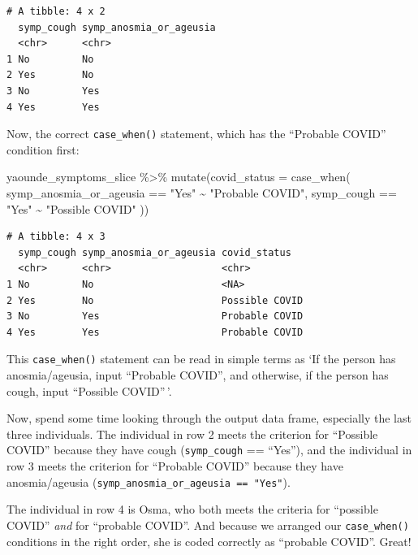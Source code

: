\documentclass[
  letterpaper,
  DIV=11,
  numbers=noendperiod]{scrreprt}
\newenvironment{Shaded}{\begin{snugshade}}{\end{snugshade}}
\newcommand{\AttributeTok}[1]{\textcolor[rgb]{0.40,0.45,0.13}{#1}}
\newcommand{\FunctionTok}[1]{\textcolor[rgb]{0.28,0.35,0.67}{#1}}
\newcommand{\NormalTok}[1]{\textcolor[rgb]{0.00,0.23,0.31}{#1}}
\newcommand{\SpecialCharTok}[1]{\textcolor[rgb]{0.37,0.37,0.37}{#1}}
\newcommand{\StringTok}[1]{\textcolor[rgb]{0.13,0.47,0.30}{#1}}
\begin{document}
\begin{verbatim}
# A tibble: 4 x 2
  symp_cough symp_anosmia_or_ageusia
  <chr>      <chr>                  
1 No         No                     
2 Yes        No                     
3 No         Yes                    
4 Yes        Yes                    
\end{verbatim}

Now, the correct \texttt{case\_when()} statement, which has the
``Probable COVID'' condition first:

\begin{Shaded}
\begin{Highlighting}[]
\NormalTok{yaounde\_symptoms\_slice }\SpecialCharTok{\%\textgreater{}\%} 
  \FunctionTok{mutate}\NormalTok{(}\AttributeTok{covid\_status =} \FunctionTok{case\_when}\NormalTok{(}
\NormalTok{    symp\_anosmia\_or\_ageusia }\SpecialCharTok{==} \StringTok{"Yes"} \SpecialCharTok{\textasciitilde{}} \StringTok{"Probable COVID"}\NormalTok{, }
\NormalTok{    symp\_cough }\SpecialCharTok{==} \StringTok{"Yes"}  \SpecialCharTok{\textasciitilde{}} \StringTok{"Possible COVID"}
\NormalTok{    ))}
\end{Highlighting}
\end{Shaded}

\begin{verbatim}
# A tibble: 4 x 3
  symp_cough symp_anosmia_or_ageusia covid_status  
  <chr>      <chr>                   <chr>         
1 No         No                      <NA>          
2 Yes        No                      Possible COVID
3 No         Yes                     Probable COVID
4 Yes        Yes                     Probable COVID
\end{verbatim}

This \texttt{case\_when()} statement can be read in simple terms as `If
the person has anosmia/ageusia, input ``Probable COVID'', and otherwise,
if the person has cough, input ``Possible COVID''\,'.

Now, spend some time looking through the output data frame, especially
the last three individuals. The individual in row 2 meets the criterion
for ``Possible COVID'' because they have cough (\texttt{symp\_cough} ==
``Yes''), and the individual in row 3 meets the criterion for ``Probable
COVID'' because they have anosmia/ageusia
(\texttt{symp\_anosmia\_or\_ageusia\ ==\ "Yes"}).

The individual in row 4 is Osma, who both meets the criteria for
``possible COVID'' \emph{and} for ``probable COVID''. And because we
arranged our \texttt{case\_when()} conditions in the right order, she is
coded correctly as ``probable COVID''. Great!
\end{document}
